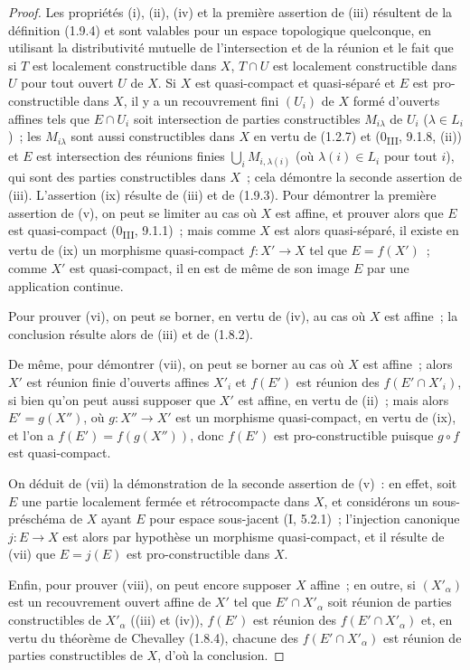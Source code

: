 \begin{proof}
Les propriétés (i), (ii), (iv) et la première assertion de (iii) résultent
de la définition (1.9.4) et sont valables pour un espace topologique
quelconque, en utilisant la distributivité mutuelle de l'intersection et de
la réunion et le fait que si $T$ est localement constructible dans $X$,
$T\cap U$ est localement constructible dans $U$ pour tout ouvert $U$ de $X$.
Si $X$ est quasi-compact et quasi-séparé et $E$ est pro-constructible dans
$X$, il y a un recouvrement fini $(U_i)$ de $X$ formé d'ouverts affines tels
que $E\cap U_i$ soit intersection de parties constructibles $M_{i\lambda}$
de $U_i$ ($\lambda\in L_i$)~; les $M_{i\lambda}$ sont aussi constructibles
dans $X$ en vertu de (1.2.7) et (0\textsubscript{III}, 9.1.8, (ii)) et $E$ est
intersection des réunions finies $\bigcup_iM_{i,\lambda(i)}$ (où
$\lambda(i)\in L_i$ pour tout $i$), qui sont des parties constructibles dans
$X$~; cela démontre la seconde assertion de (iii). L'assertion (ix) résulte
de (iii) et de (1.9.3). Pour démontrer la première assertion de (v), on peut
se limiter au cas où $X$ est affine, et prouver alors que $E$ est
quasi-compact (0\textsubscript{III}, 9.1.1)~; mais comme $X$ est alors
quasi-séparé, il existe en vertu de (ix) un morphisme quasi-compact
$f:X'\to X$ tel que $E=f(X')$~; comme $X'$ est quasi-compact, il en est de
même de son image $E$ par une application continue.

Pour prouver (vi), on peut se borner, en vertu de (iv), au cas où $X$ est
affine~; la conclusion résulte alors de (iii) et de (1.8.2).


De même, pour démontrer (vii), on peut se borner au cas où $X$ est affine~;
alors $X'$ est réunion finie d'ouverts affines $X'_i$ et $f(E')$ est réunion
des $f(E'\cap X'_i)$, si bien qu'on peut aussi supposer que $X'$ est affine,
en vertu de (ii)~; mais alors $E'=g(X'')$, où $g:X''\to X'$ est un morphisme
quasi-compact, en vertu de (ix), et l'on a $f(E')=f(g(X''))$, donc $f(E')$ est
pro-constructible puisque $g\circ f$ est quasi-compact.

On déduit de (vii) la démonstration de la seconde assertion de (v)~: en
effet, soit $E$ une partie localement fermée et rétrocompacte dans $X$, et
considérons un sous-préschéma de $X$ ayant $E$ pour espace sous-jacent (I,
5.2.1)~; l'injection canonique $j:E\to X$ est alors par hypothèse un
morphisme quasi-compact, et il résulte de (vii) que $E=j(E)$ est
pro-constructible dans $X$.

Enfin, pour prouver (viii), on peut encore supposer $X$ affine~; en outre, si
$(X'_\alpha)$ est un recouvrement ouvert affine de $X'$ tel que
$E'\cap X'_\alpha$ soit réunion de parties constructibles de $X'_\alpha$
((iii) et (iv)), $f(E')$ est réunion des $f(E'\cap X'_\alpha)$ et, en vertu
du théorème de Chevalley (1.8.4), chacune des $f(E'\cap X'_\alpha)$ est
réunion de parties constructibles de $X$, d'où la conclusion.
\end{proof}

